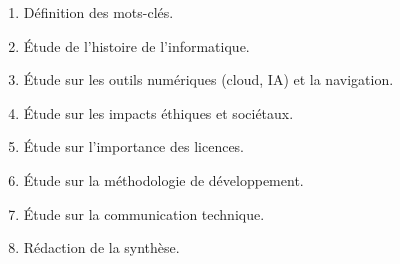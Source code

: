 \begin{enumerate}[nosep]
    \item Définition des mots-clés.
    \item Étude de l’histoire de l’informatique.
    \item Étude sur les outils numériques (cloud, IA) et la navigation.
    \item Étude sur les impacts éthiques et sociétaux.
    \item Étude sur l’importance des licences.
    \item Étude sur la méthodologie de développement.
    \item Étude sur la communication technique.
    \item Rédaction de la synthèse.
\end{enumerate}
